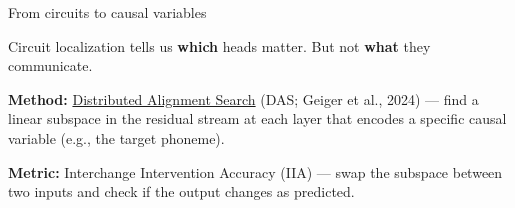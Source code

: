 \documentclass[10pt,aspectratio=169]{beamer}
\begin{document}
\begin{frame}{From circuits to causal variables}
\hypertarget{sl:cvl}{}

Circuit localization tells us \textbf{which} heads matter. But not \textbf{what} they communicate.

\vspace{0.8em}
\begin{center}
\end{center}

\vspace{0.8em}
\textbf{Method:} \href{https://arxiv.org/abs/2303.02536}{Distributed Alignment Search} (DAS; Geiger et al., 2024) --- find a linear subspace in the residual stream at each layer that encodes a specific causal variable (e.g., the target phoneme).

\vspace{0.3em}
\textbf{Metric:} Interchange Intervention Accuracy (IIA) --- swap the subspace between two inputs and check if the output changes as predicted.
\end{frame}
\end{document}
